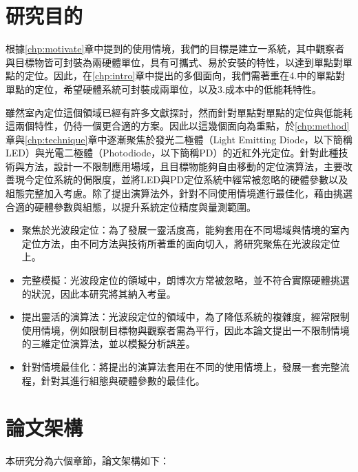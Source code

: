 
\section{研究目的}
\label{chp:purpose}

根據\ref{chp:motivate}章中提到的使用情境，我們的目標是建立一系統，其中觀察者與目標物皆可封裝為兩硬體單位，具有可攜式、易於安裝的特性，以達到單點對單點的定位。因此，在\ref{chp:intro}章中提出的多個面向，我們需著重在4.中的單點對單點的定位，希望硬體系統可封裝成兩單位，以及3.成本中的低能耗特性。

雖然室內定位這個領域已經有許多文獻探討，然而針對單點對單點的定位與低能耗這兩個特性，仍待一個更合適的方案。因此以這幾個面向為重點，於\ref{chp:method}章與\ref{chp:technique}章中逐漸聚焦於發光二極體（Light Emitting Diode，以下簡稱LED）與光電二極體（Photodiode，以下簡稱PD）的近紅外光定位。針對此種技術與方法，設計一不限制應用場域，且目標物能夠自由移動的定位演算法，主要改善現今定位系統的侷限度，並將LED與PD定位系統中經常被忽略的硬體參數以及組態完整加入考慮。除了提出演算法外，針對不同使用情境進行最佳化，藉由挑選合適的硬體參數與組態，以提升系統定位精度與量測範圍。




\begin{itemize} 
    \item{聚焦於光波段定位}：為了發展一靈活度高，能夠套用在不同場域與情境的室內定位方法，由不同方法與技術所著重的面向切入，將研究聚焦在光波段定位上。
    \item{完整模擬}：光波段定位的領域中，朗博次方常被忽略，並不符合實際硬體挑選的狀況，因此本研究將其納入考量。
    \item{提出靈活的演算法}：光波段定位的領域中，為了降低系統的複雜度，經常限制使用情境，例如限制目標物與觀察者需為平行，因此本論文提出一不限制情境的三維定位演算法，並以模擬分析誤差。
    \item{針對情境最佳化}：將提出的演算法套用在不同的使用情境上，發展一套完整流程，針對其進行組態與硬體參數的最佳化。
\end{itemize}









\section{論文架構}
本研究分為六個章節，論文架構如下：

